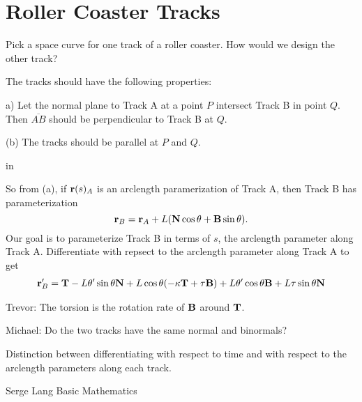 \documentclass{ximera}
\newcommand{\pskip}{\vskip 0.1 in}
\begin{document}
\section*{Roller Coaster Tracks}
Pick a space curve for one track of a roller coaster. How would we design the other track?

The tracks should have the following properties:

a) Let the normal plane to Track A at a point $P$ intersect Track B in point $Q$. Then $\overline{AB}$ should be perpendicular to Track B at $Q$.

(b) The tracks should be parallel at $P$ and $Q$.

\pskip

So from (a), if ${\bf r}(s)_A$ is an arclength paramerization of Track A, then Track B has parameterization
\[
      {\bf r}_B = {\bf r}_A + L ( {\bf N} \cos\theta  + {\bf B} \sin\theta ) .
\]
Our goal is to parameterize Track B in terms of $s$, the arclength parameter along Track A. 
Differentiate with repsect to the arclength parameter along Track A to get
\begin{align*}
      {\bf r}_B^\prime = {\bf T} -L\theta^\prime \sin\theta {\bf N} + L\cos\theta (-\kappa {\bf T} + \tau {\bf B}) + L\theta^\prime\cos\theta {\bf B} + L\tau \sin\theta {\bf N}
\end{align*}


Trevor: The torsion is the rotation rate of ${\bf B}$ around ${\bf T}$.

Michael: Do the two tracks have the same normal and binormals?

Distinction between differentiating with respect to time and with respect to the arclength parameters along each track.

Serge Lang Basic Mathematics
\end{document}
